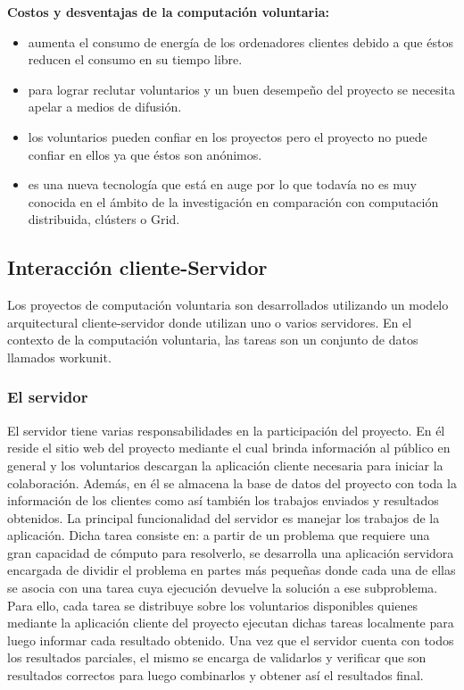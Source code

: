 \vspace{5mm}

\textbf{Costos y desventajas de la computación voluntaria:}

\begin{itemize}
 \item aumenta el consumo de energía de los ordenadores clientes debido a que éstos reducen el consumo en su tiempo libre.
 \item para lograr reclutar voluntarios y un buen desempeño del proyecto se necesita apelar a medios de difusión.
 \item los voluntarios pueden confiar en los proyectos pero el proyecto no puede confiar en ellos ya que éstos son anónimos.
 \item es una nueva tecnología que está en auge por lo que todavía no es muy conocida en el ámbito de la investigación en comparación con computación distribuida, clústers o Grid.
\end{itemize}

\subsection{Interacción cliente-Servidor}

Los proyectos de computación voluntaria son desarrollados utilizando un modelo arquitectural cliente-servidor donde utilizan uno o varios servidores.
En el contexto de la computación voluntaria, las tareas son un conjunto de datos llamados workunit.

\subsubsection{El servidor}

El servidor tiene varias responsabilidades en la participación del proyecto. 
En él reside el sitio web del proyecto mediante el cual brinda información al público en general y los voluntarios descargan
 la aplicación cliente necesaria para iniciar la colaboración. Además, en él se almacena la base de datos del proyecto con toda la información
 de los clientes como así también los trabajos enviados y resultados obtenidos. 
La principal funcionalidad del servidor es manejar los trabajos de la aplicación. Dicha tarea consiste en: a partir de un problema que requiere una gran capacidad de cómputo para resolverlo, se desarrolla una aplicación servidora encargada de dividir el problema en partes más pequeñas donde cada una de ellas se asocia con una tarea cuya ejecución devuelve la solución a ese subproblema. Para ello, cada tarea se distribuye sobre los voluntarios disponibles quienes mediante la aplicación cliente del proyecto ejecutan dichas tareas localmente para luego informar cada resultado obtenido. Una vez que el servidor cuenta con todos los resultados parciales, el mismo se encarga de validarlos y verificar que son resultados correctos para luego combinarlos y obtener así el resultados final.

